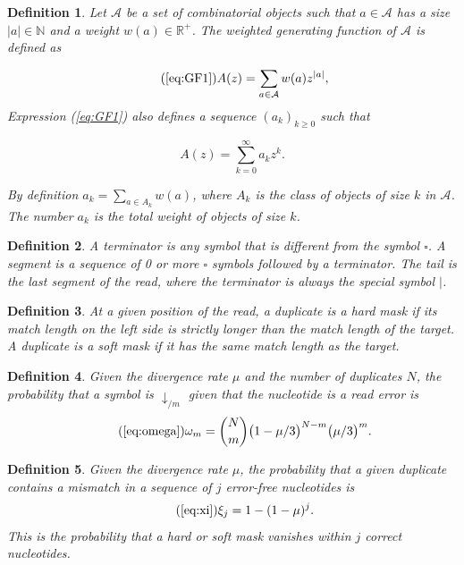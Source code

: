 \documentclass{article}
\newtheorem{definition}{Definition}
\begin{document}
\begin{definition}
Let $\mathcal{A}$ be a set of combinatorial objects such that $a \in
\mathcal{A}$ has a size $|a| \in \mathbb{N}$ and a weight $w(a) \in
\mathbb{R}^+$. The weighted generating function of $\mathcal{A}$ is
defined as

\begin{equation}
\tag{\ref{eq:GF1}}
A(z) = \sum_{a \in \mathcal{A}} w(a) z^{|a|},
\end{equation}
Expression (\ref{eq:GF1}) also defines a sequence $(a_k)_{k \geq 0}$ such
that 

\begin{equation*}
A(z) = \sum_{k=0}^\infty a_k z^k.
\end{equation*}

By definition $a_k = \sum_{a \in A_k}w(a)$, where $A_k$ is the class of
objects of size $k$ in $\mathcal{A}$. The number $a_k$ is the
total weight of objects of size $k$.
\end{definition}

\begin{definition}
\label{def:seg}
A terminator is any symbol that is different from the symbol $\square$. A
segment is a sequence of 0 or more $\square$ symbols followed by a
terminator. The tail is the last segment of the read, where the terminator
is always the special symbol $|$.
\end{definition}

\begin{definition}
At a given position of the read, a duplicate is a \emph{hard mask} if its
match length on the left side is strictly longer than the match length
of the target. A duplicate is a \emph{soft mask} if it has the same match
length as the target.
\end{definition}

\begin{definition}
Given the divergence rate $\mu$ and the number of duplicates $N$, the
probability that a symbol is $\downarrow_{/m}$ given that the nucleotide
is a read error is
\begin{equation}
\tag{\ref{eq:omega}}
\omega_m = {N \choose m} \big(1 - \mu/3\big)^{N-m} \big(\mu/3\big)^m.
\end{equation}
\end{definition}

\begin{definition}
Given the divergence rate $\mu$, the probability that a given duplicate
contains a mismatch in a sequence of $j$ error-free nucleotides is
\begin{equation}
\tag{\ref{eq:xi}}
\xi_j = 1-(1-\mu)^j.
\end{equation}
This is the probability that a hard or soft mask vanishes within $j$
correct nucleotides.
\end{definition}
\end{document}
